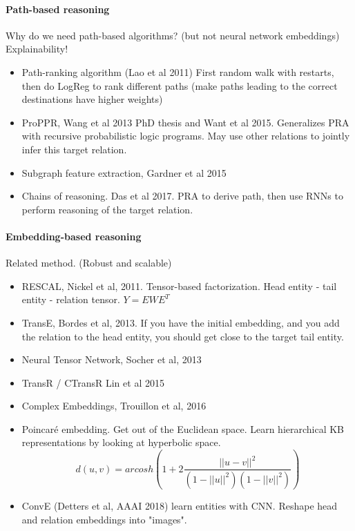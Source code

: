 \paragraph{Path-based reasoning}
Why do we need path-based algorithms? (but not neural network embeddings) Explainability!
\begin{itemize}
	\item Path-ranking algorithm (Lao et al 2011) First random walk with restarts, then do LogReg to rank different paths (make paths leading to the correct destinations have higher weights)
	
	\item ProPPR, Wang et al 2013 PhD thesis and Want et al 2015. Generalizes PRA with recursive probabilistic logic programs. May use other relations to jointly infer this target relation.
	
	\item Subgraph feature extraction, Gardner et al 2015
	
	\item Chains of reasoning. Das et al 2017. PRA to derive path, then use RNNs to perform reasoning of the target relation.
	
\end{itemize}


\paragraph{Embedding-based reasoning}
Related method. (Robust and scalable)
\begin{itemize}
	\item RESCAL, Nickel et al, 2011. Tensor-based factorization. Head entity - tail entity - relation tensor. $Y=EWE^T$
	\item TransE, Bordes et al, 2013. If you have the initial embedding, and you add the relation to the head entity, you should get close to the target tail entity.
	\item Neural Tensor Network, Socher et al, 2013
	\item TransR / CTransR Lin et al 2015
	\item Complex Embeddings, Trouillon et al, 2016
	\item Poincar{\'e} embedding. Get out of the Euclidean space. Learn hierarchical KB representations by looking at hyperbolic space. $$d(u,v) = arcosh(1+2\frac{||u-v||^2}{(1-||u||^2)(1-||v||^2)})$$
	\item ConvE (Detters et al, AAAI 2018) learn entities with CNN. Reshape head and relation embeddings into "images".
\end{itemize}


